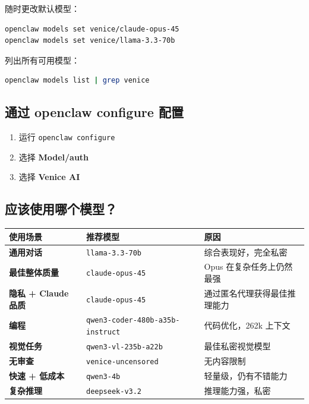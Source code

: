 随时更改默认模型：

\begin{lstlisting}[language=bash]
openclaw models set venice/claude-opus-45
openclaw models set venice/llama-3.3-70b
\end{lstlisting}


列出所有可用模型：

\begin{lstlisting}[language=bash]
openclaw models list | grep venice
\end{lstlisting}


\subsection{通过 openclaw configure 配置}


\begin{enumerate}
  \item 运行 \texttt{openclaw configure}
  \item 选择 \textbf{Model/auth}
  \item 选择 \textbf{Venice AI}
\end{enumerate}


\subsection{应该使用哪个模型？}



\begin{table}[h]
\centering
\small
\begin{tabular}{|l|l|l|}
\hline
使用场景 & 推荐模型 & 原因 \\
\hline
\textbf{通用对话} & \texttt{llama-3.3-70b} & 综合表现好，完全私密 \\
\hline
\textbf{最佳整体质量} & \texttt{claude-opus-45} & Opus 在复杂任务上仍然最强 \\
\hline
\textbf{隐私 + Claude 品质} & \texttt{claude-opus-45} & 通过匿名代理获得最佳推理能力 \\
\hline
\textbf{编程} & \texttt{qwen3-coder-480b-a35b-instruct} & 代码优化，262k 上下文 \\
\hline
\textbf{视觉任务} & \texttt{qwen3-vl-235b-a22b} & 最佳私密视觉模型 \\
\hline
\textbf{无审查} & \texttt{venice-uncensored} & 无内容限制 \\
\hline
\textbf{快速 + 低成本} & \texttt{qwen3-4b} & 轻量级，仍有不错能力 \\
\hline
\textbf{复杂推理} & \texttt{deepseek-v3.2} & 推理能力强，私密 \\
\hline
\end{tabular}
\end{table}



